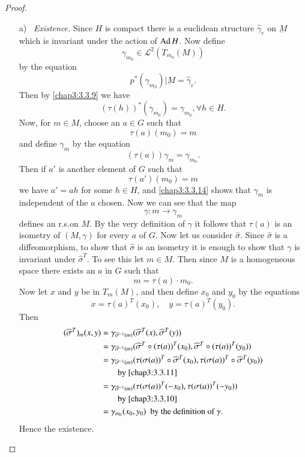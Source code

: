 \begin{proof}
\begin{itemize}
\item[a)]~{\em Existence.} Since $H$ is compact there is a euclidean
  structure $\widehat{\gamma}_{e}$ on $\underbar{M}$ which is
  invariant under the action of $\operatorname{Ad} H$. Now define
$$
\gamma_{m_{0}}\in\mathscr{L}^{2}(T_{m_{0}}(M))
$$
by the equation
\begin{equation*}
p^{\ast}(\gamma_{m_{0}})|\underbar{M} =
\widehat{\gamma}_{e}.\tag{3.3.13}\label{chap3:3.3.13}   
\end{equation*}
Then by \eqref{chap3:3.3.9} we have
\begin{equation*}
(\tau(h))^{\ast}(\gamma_{m_{0}})=\gamma_{m_{0}},\forall h\in
  H.\tag{3.3.14}\label{chap3:3.3.14} 
\end{equation*}
Now, for $m\in M$, choose an $a\in G$ such that
$$
\tau(a)(m_{0})=m
$$
and define $\gamma_{m}$ by the equation
\begin{equation*}
(\tau(a))\gamma_{m}=\gamma_{m_{0}}.\tag{3.3.15}\label{chap3:3.3.15}
\end{equation*}
Then if $a'$ is another element of $G$ such that
$$
\tau(a')(m_{0})=m
$$
we have $a'=ah$ for some $h\in H$, and \eqref{chap3:3.3.14} shows that
$\gamma_{m}$ is independent of the $a$ chosen. Now we can see that the
map
$$
\gamma:m\to\gamma_{m}
$$\pageoriginale
defines an r.s.\@ on $M$. By the very definition of $\gamma$ it
follows that $\tau(a)$ is an isometry of $(M,\gamma)$ for every $a$ of
$G$. Now let us consider $\widehat{\sigma}$. Since $\widehat{\sigma}$
is a diffeomorphism, to show that $\widehat{\sigma}$ is an isometry it
is enough to show that $\gamma$ is invariant under
$\widehat{\sigma}^{T}$. To see this let $m\in M$. Then since $M$ is a
homogeneous space there exists an $a$ in $G$ such that
$$
m=\tau(a)\cdot m_{0}.
$$
Now let $x$ and $y$ be in $T_{m}(M)$, and then define $x_{0}$ and
$y_{0}$ by the equations
$$
x=\tau(a)^{T}(x_{0}), \quad y=\tau(a)^{T}(y_{0}).
$$
Then
\begin{align*}
(\widehat{\sigma}^{T})_{m}(x,y) &=
  \gamma_{\widehat{\sigma}^{-1}(m)}(\widehat{\sigma}^{T}(x),\widehat{\sigma}^{T}(y))\\
&= \gamma_{\widehat{\sigma}^{-1}(m)}(\widehat{\sigma}^{T}\circ
  (\tau(a))^{T}(x_{0}), \widehat{\sigma}^{T}\circ
  (\tau(a))^{T}(y_{0}))\\
&= \gamma_{\widehat{\sigma}^{-1}(m)}(\tau(\sigma(a))^{T}\circ
  \widehat{\sigma}^{T}(x_{0}),
  \tau(\sigma(a))^{T}\circ\widehat{\sigma}^{T}(y_{0}))\\
&\qquad \text{by \eqref{chap3:3.3.11}}\\
&=\gamma_{\widehat{\sigma}^{-1}(m)}(\tau(\sigma(a))^{T}(-x_{0}),\tau(\sigma(a))^{T}(-y_{0}))\\
&\qquad \text{by \eqref{chap3:3.3.10}}\\
&=\gamma_{m_{0}}(x_{0},y_{0})\text{ \ by the definition of $\gamma$.}
\end{align*}
Hence the existence.


\end{itemize}
\end{proof}
